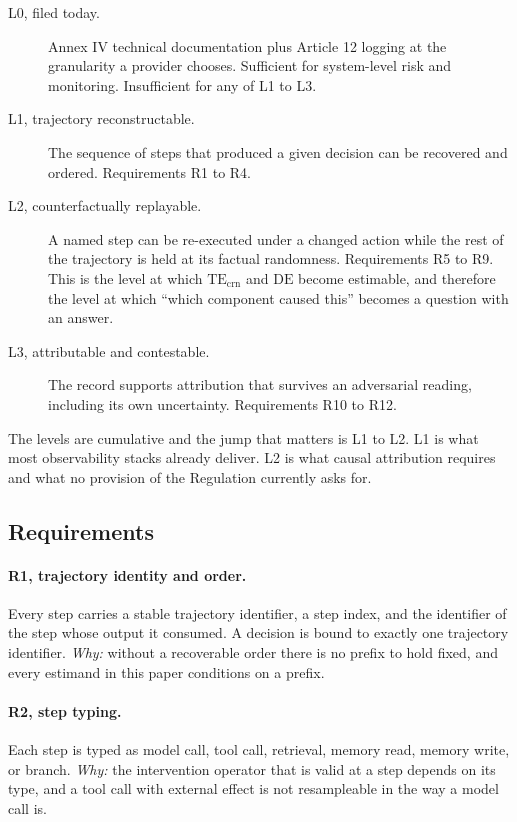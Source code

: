 \documentclass[11pt]{article}
\theoremstyle{remark}
\newcommand{\TEcrn}{\mathrm{TE}_{\mathrm{crn}}}
\newcommand{\DE}{\mathrm{DE}}
\begin{document}
\begin{description}
\item[L0, filed today.] Annex IV technical documentation plus Article 12 logging
  at the granularity a provider chooses. Sufficient for system-level risk and
  monitoring. Insufficient for any of L1 to L3.
\item[L1, trajectory reconstructable.] The sequence of steps that produced a
  given decision can be recovered and ordered. Requirements R1 to R4.
\item[L2, counterfactually replayable.] A named step can be re-executed under a
  changed action while the rest of the trajectory is held at its factual
  randomness. Requirements R5 to R9. This is the level at which $\TEcrn$ and
  $\DE$ become estimable, and therefore the level at which ``which component
  caused this'' becomes a question with an answer.
\item[L3, attributable and contestable.] The record supports attribution that
  survives an adversarial reading, including its own uncertainty. Requirements
  R10 to R12.
\end{description}

The levels are cumulative and the jump that matters is L1 to L2. L1 is what most
observability stacks already deliver. L2 is what causal attribution requires and
what no provision of the Regulation currently asks for.

\subsection{Requirements}

\paragraph{R1, trajectory identity and order.} Every step carries a stable
trajectory identifier, a step index, and the identifier of the step whose output
it consumed. A decision is bound to exactly one trajectory identifier.
\emph{Why:} without a recoverable order there is no prefix to hold fixed, and
every estimand in this paper conditions on a prefix.

\paragraph{R2, step typing.} Each step is typed as model call, tool call,
retrieval, memory read, memory write, or branch. \emph{Why:} the intervention
operator that is valid at a step depends on its type, and a tool call with
external effect is not resampleable in the way a model call is.
\end{document}
